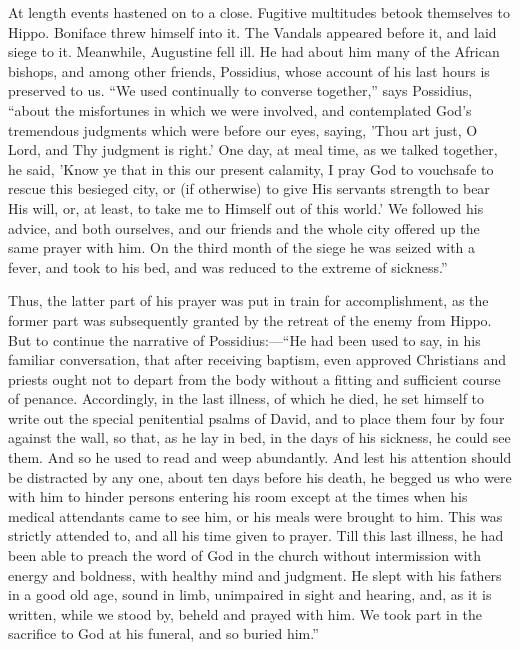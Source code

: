 At length events hastened on to a close. Fugitive multitudes betook
themselves to Hippo. Boniface threw himself into it. The Vandals
appeared before it, and laid siege to it. Meanwhile, Augustine fell
ill. He had about him many of the African bishops, and among other
friends, Possidius, whose account of his last hours is preserved to
us. ``We used continually to converse together,'' says
Possidius, ``about the misfortunes in which we were involved, and
contemplated God's tremendous judgments which were before our eyes,
saying, 'Thou art just, O Lord, and Thy judgment is right.' One day,
at meal time, as we talked together, he said, 'Know ye that in this
our present calamity, I pray God to vouchsafe to rescue this besieged
city, or (if otherwise) to give His servants strength to bear His
will, or, at least, to take me to Himself out of this world.' We
followed his advice, and both ourselves, and our friends and the whole
city offered up the same prayer with him. On the third month of the
siege he was seized with a fever, and took to his bed, and was reduced
to the extreme of sickness.''

Thus, the latter part of his prayer was put in train for
accomplishment, as the former part was subsequently granted by the
retreat of the enemy from Hippo. But to continue the narrative of
Possidius:—``He had been used to say, in his familiar
conversation, that after receiving baptism, even approved
Christians and priests ought not to depart from the body without a
fitting and sufficient course of penance. Accordingly, in the last
illness, of which he died, he set himself to write out the special
penitential psalms of David, and to place them four by four against
the wall, so that, as he lay in bed, in the days of his sickness, he
could see them. And so he used to read and weep abundantly. And lest
his attention should be distracted by any one, about ten days before
his death, he begged us who were with him to hinder persons entering
his room except at the times when his medical attendants came to see
him, or his meals were brought to him. This was strictly attended to,
and all his time given to prayer. Till this last illness, he had been
able to preach the word of God in the church without intermission with
energy and boldness, with healthy mind and judgment. He slept with his
fathers in a good old age, sound in limb, unimpaired in sight and
hearing, and, as it is written, while we stood by, beheld and prayed
with him. We took part in the sacrifice to God at his funeral, and so
buried him.''


